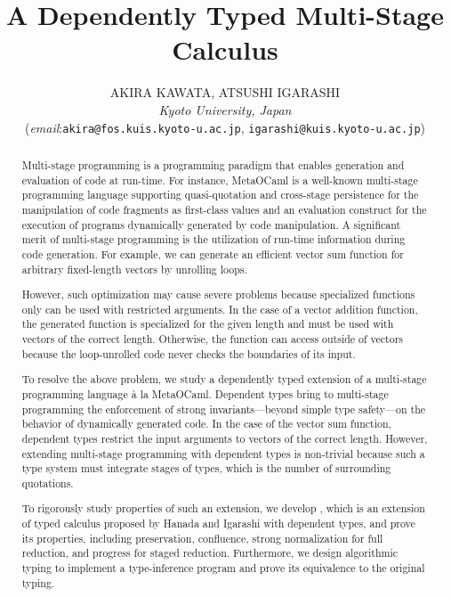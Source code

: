 \documentclass{jfp1}
\begin{document}
\title{A Dependently Typed Multi-Stage Calculus}
\author[Akira Kawata, Igarashi Atsushi]{AKIRA KAWATA, ATSUSHI IGARASHI\\
\textit{Kyoto University, Japan}\\
(\textit{email}:\texttt{akira@fos.kuis.kyoto-u.ac.jp}, \texttt{igarashi@kuis.kyoto-u.ac.jp})
}			%

\maketitle

\begin{abstract}


Multi-stage programming is a programming paradigm that enables generation and
evaluation of code at run-time. For instance, MetaOCaml is a well-known
multi-stage programming language supporting quasi-quotation and cross-stage
persistence for the manipulation of code fragments as first-class values
and an evaluation construct for the execution of programs dynamically
generated by code manipulation. A significant merit of multi-stage
programming is the utilization of run-time information during code
generation. For example, we can generate an efficient vector sum function
for arbitrary fixed-length vectors by unrolling loops.


However, such optimization may cause severe problems because specialized
functions only can be used with restricted arguments. In the case of a
vector addition function, the generated function is specialized for the
given length and must be used with vectors of the correct length.
Otherwise, the function can access outside of vectors because the
loop-unrolled code never checks the boundaries of its input.


To resolve the above problem, we study a dependently typed extension of a
multi-stage programming language \`a la MetaOCaml. Dependent types bring to
multi-stage programming the enforcement of strong invariants---beyond
simple type safety---on the behavior of dynamically generated code. In the
case of the vector sum function, dependent types restrict the input
arguments to vectors of the correct length. However, extending multi-stage
programming with dependent types is non-trivial because such a type system
must integrate stages of types, which is the number of surrounding
quotations.


To rigorously study properties of such an extension, we develop \LMD, which is
an extension of typed calculus \LTP proposed by Hanada and Igarashi with
dependent types, and prove its properties, including preservation,
confluence, strong normalization for full reduction, and progress for
staged reduction.  Furthermore, we design algorithmic typing to implement a
type-inference program and prove its equivalence to the original typing. 

\end{abstract}
\end{document}
